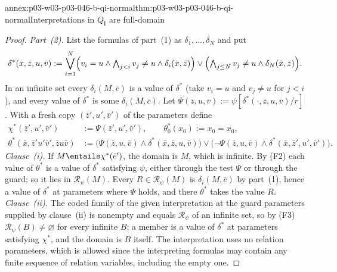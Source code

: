 \begin{annexitem}{annex:p03-w03-p03-046-b-qi-normal}{thm:p03-w03-p03-046-b-qi-normal}{Interpretations in \(Q_{\mathrm I}\) are full-domain}
\begin{proof}
\emph{Part~(2).} List the formulas of part~(1) as
\(\delta_1,\dots,\delta_N\) and put
\[
\delta^*(\bar x,\bar z,u,\bar v):=\bigvee_{i=1}^{N}\Bigl(v_i=u\wedge
\textstyle\bigwedge_{j<i}v_j\neq u\wedge\delta_i(\bar x,\bar z)\Bigr)\vee
\Bigl(\bigwedge_{j\le N}v_j\neq u\wedge\delta_N(\bar x,\bar z)\Bigr).
\]
In an infinite set every \(\delta_i(M,\bar c)\) is a value of \(\delta^*\)
(take \(v_i=u\) and \(v_j\neq u\) for \(j<i\)), and every value of
\(\delta^*\) is some \(\delta_i(M,\bar c)\). Let
\(\Psi(\bar z,u,\bar v):=\psi[\delta^*(\cdot,\bar z,u,\bar v)/r]\). With a
fresh copy \((\bar z',u',\bar v')\) of the parameters define
\begin{align*}
\chi^*(\bar z',u',\bar v')&:=\Psi(\bar z',u',\bar v'),\qquad
\theta_0^*(x_0):=x_0=x_0,\\
\theta^*(\bar x,\bar z'u'\bar v',\bar zu\bar v)&:=\bigl(\Psi(\bar z,u,\bar
v)\wedge\delta^*(\bar x,\bar z,u,\bar v)\bigr)\vee\bigl(\neg\Psi(\bar z,u,\bar
v)\wedge\delta^*(\bar x,\bar z',u',\bar v')\bigr).
\end{align*}
\emph{Clause~(i).} If \(M\entails\chi^*(\bar e')\), the domain is \(M\),
which is infinite. By (F2) each value of \(\theta^*\) is a value of
\(\delta^*\) satisfying \(\psi\), either through the test \(\Psi\) or through
the guard; so it lies in \(\mathscr R_\psi(M)\). Every \(R\in\mathscr
R_\psi(M)\) is \(\delta_i(M,\bar c)\) by part~(1), hence a value of
\(\delta^*\) at parameters where \(\Psi\) holds, and there \(\theta^*\)
takes the value \(R\). \emph{Clause~(ii).} The coded family of the given
interpretation at the guard parameters supplied by clause~(ii) is nonempty
and equals \(\mathscr R_\psi\) of an infinite set, so by (F3)
\(\mathscr R_\psi(B)\neq\varnothing\) for every infinite \(B\); a member is
a value of \(\delta^*\) at parameters satisfying \(\chi^*\), and the domain
is \(B\) itself. The interpretation uses no relation parameters, which is
allowed since the interpreting formulas may contain any finite sequence of
relation variables, including the empty one.
\end{proof}
\end{annexitem}

